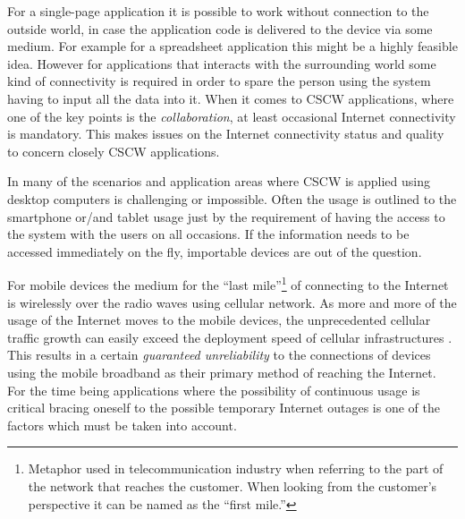 


For a single-page application it is possible to work without connection to the outside world, in case the application code is delivered to the device via some medium. For example for a spreadsheet application this might be a highly feasible idea. However for applications that interacts with the surrounding world some kind of connectivity is required in order to spare the person using the system having to input all the data into it. When it comes to CSCW applications, where one of the key points is the \textit{collaboration}, at least occasional Internet connectivity is mandatory. This makes issues on the Internet connectivity status and quality to concern closely CSCW applications. %

In many of the scenarios and application areas where CSCW is applied using desktop computers is challenging or impossible. Often the usage is outlined to the smartphone or/and tablet usage just by the requirement of having the access to the system with the users on all occasions. If the information needs to be accessed immediately on the fly, importable devices are out of the question.

For mobile devices the medium for the ``last mile''\footnote{Metaphor used in telecommunication industry when referring to the part of the network that reaches the customer. When looking from the customer's perspective it can be named as the ``first mile.''} of connecting to the Internet is wirelessly over the radio waves using cellular network. As more and more of the usage of the Internet moves to the mobile devices, the unprecedented cellular traffic growth can easily exceed the deployment speed of cellular infrastructures \cite{qian_web_2012}. This results in a certain \textit{guaranteed unreliability} to the connections of devices using the mobile broadband as their primary method of reaching the Internet. For the time being applications where the possibility of continuous usage is critical bracing oneself to the possible temporary Internet outages is one of the factors which must be taken into account.


